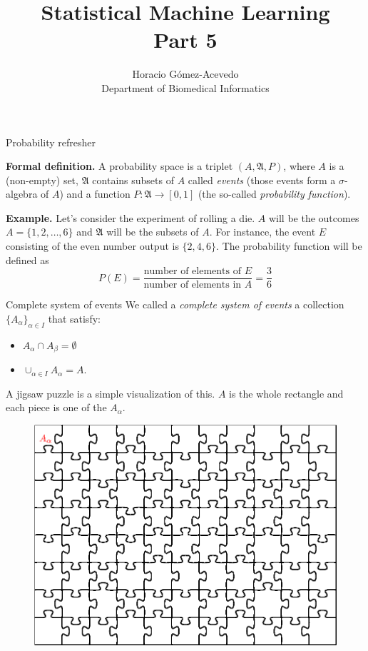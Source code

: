 \documentclass{beamer}
\title{Statistical Machine Learning\\ Part 5}
\author{Horacio G\'omez-Acevedo\\ Department of Biomedical Informatics}
\begin{document}
	\begin{frame}[plain]
		\maketitle
	\end{frame}
\begin{frame}{Probability refresher}
	
	{\bf Formal definition. } A probability space is a triplet $(A, \mathfrak{A},P )$, where $A$ is a (non-empty) set, $\mathfrak{A}$ contains subsets of $A$ called {\it events} (those events form a $\sigma$-algebra of $A$) and a function $P\colon \mathfrak{A}\to [0,1]$ (the so-called {\it probability function}).
	
	{\bf Example.}
	Let's consider the experiment of rolling a die. $A$ will be the outcomes $A=\{ 1,2, \ldots, 6\}$ and $\mathfrak{A}$ will be the subsets of $A$. For instance, the event $E$ consisting of the even number output is $\{2,4,6\}$. The probability function will be defined as 
	\begin{equation*}
		P(E) = \frac{ \textrm{number of elements of }E}{\textrm{number of elements in }A}= \frac{3}{6}
	\end{equation*}
	
\end{frame}

\begin{frame}{Complete system of events}
	We called a {\it complete system of events} a collection  $\{ A_\alpha \}_{\alpha \in I}$ that satisfy:
	\begin{itemize}
		\item $A_\alpha \cap A_\beta = \emptyset$
		\item $\cup_{\alpha \in I} A_\alpha= A$.
	\end{itemize}
 A jigsaw puzzle is a simple visualization of this. $A$ is the whole rectangle and each piece is one of the $A_\alpha$. 
 \begin{figure}[h]
 	\centering
 	\includegraphics[scale=0.35]{../../Figures/fig_jigsaw.png}
 \end{figure}
\end{frame}
\end{document}
